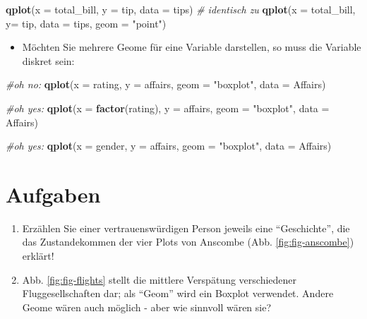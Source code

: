 \documentclass[12pt,ngerman,]{book}
\newenvironment{Shaded}{\begin{snugshade}}{\end{snugshade}}
\newcommand{\KeywordTok}[1]{\textcolor[rgb]{0.13,0.29,0.53}{\textbf{{#1}}}}
\newcommand{\DataTypeTok}[1]{\textcolor[rgb]{0.13,0.29,0.53}{{#1}}}
\newcommand{\StringTok}[1]{\textcolor[rgb]{0.31,0.60,0.02}{{#1}}}
\newcommand{\CommentTok}[1]{\textcolor[rgb]{0.56,0.35,0.01}{\textit{{#1}}}}
\newcommand{\NormalTok}[1]{{#1}}
\providecommand{\tightlist}{%
  \setlength{\itemsep}{0pt}\setlength{\parskip}{0pt}}
\renewenvironment{Shaded}{\begin{kframe}}{\end{kframe}}
\begin{document}
\begin{Shaded}
\begin{Highlighting}[]
\KeywordTok{qplot}\NormalTok{(}\DataTypeTok{x =} \NormalTok{total_bill, }\DataTypeTok{y =} \NormalTok{tip, }\DataTypeTok{data =} \NormalTok{tips)  }\CommentTok{# identisch zu}
\KeywordTok{qplot}\NormalTok{(}\DataTypeTok{x =} \NormalTok{total_bill, }\DataTypeTok{y=}  \NormalTok{tip, }\DataTypeTok{data =} \NormalTok{tips, }\DataTypeTok{geom =} \StringTok{"point"}\NormalTok{)}
\end{Highlighting}
\end{Shaded}

\begin{itemize}
\tightlist
\item
  Möchten Sie mehrere Geome für eine Variable darstellen, so muss die
  Variable diskret sein:
\end{itemize}

\begin{Shaded}
\begin{Highlighting}[]
\CommentTok{#oh no: }
\KeywordTok{qplot}\NormalTok{(}\DataTypeTok{x =} \NormalTok{rating, }\DataTypeTok{y =} \NormalTok{affairs, }\DataTypeTok{geom =} \StringTok{"boxplot"}\NormalTok{, }\DataTypeTok{data =} \NormalTok{Affairs)}

\CommentTok{#oh yes: }
\KeywordTok{qplot}\NormalTok{(}\DataTypeTok{x =} \KeywordTok{factor}\NormalTok{(rating), }\DataTypeTok{y =} \NormalTok{affairs, }\DataTypeTok{geom =} \StringTok{"boxplot"}\NormalTok{, }\DataTypeTok{data =} \NormalTok{Affairs)}

\CommentTok{#oh yes: }
\KeywordTok{qplot}\NormalTok{(}\DataTypeTok{x =} \NormalTok{gender, }\DataTypeTok{y =} \NormalTok{affairs, }\DataTypeTok{geom =} \StringTok{"boxplot"}\NormalTok{, }\DataTypeTok{data =} \NormalTok{Affairs)}
\end{Highlighting}
\end{Shaded}

\section{Aufgaben}\label{aufgaben-7}

\begin{enumerate}
\def\labelenumi{\arabic{enumi}.}
\item
  Erzählen Sie einer vertrauenswürdigen Person jeweils eine
  ``Geschichte'', die das Zustandekommen der vier Plots von Anscombe
  (Abb. \ref{fig:fig-anscombe}) erklärt!
\item
  Abb. \ref{fig:fig-flights} stellt die mittlere Verspätung
  verschiedener Fluggesellschaften dar; als ``Geom'' wird ein Boxplot
  verwendet. Andere Geome wären auch möglich - aber wie sinnvoll wären
  sie?
\end{enumerate}
\end{document}
